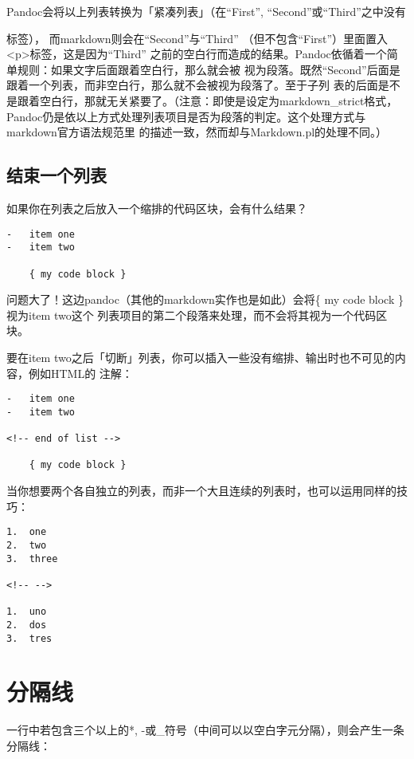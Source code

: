 \documentclass[fancyhdr,bookmark]{ctexbook}
\begin{document}
Pandoc会将以上列表转换为「紧凑列表」（在``First'',
``Second''或``Third''之中没有

标签）， 而markdown则会在``Second''与``Third''
（但不包含``First''）里面置入\textless{}p\textgreater{}标签，这是因为``Third''
之前的空白行而造成的结果。Pandoc依循着一个简单规则：如果文字后面跟着空白行，那么就会被
视为段落。既然``Second''后面是跟着一个列表，而非空白行，那么就不会被视为段落了。至于子列
表的后面是不是跟着空白行，那就无关紧要了。（注意：即使是设定为markdown\_strict格式，
Pandoc仍是依以上方式处理列表项目是否为段落的判定。这个处理方式与markdown官方语法规范里
的描述一致，然而却与Markdown.pl的处理不同。）

\subsection{结束一个列表}\label{ux7ed3ux675fux4e00ux4e2aux5217ux8868}

如果你在列表之后放入一个缩排的代码区块，会有什么结果？

\begin{lstlisting}
-   item one
-   item two

    { my code block }
\end{lstlisting}

问题大了！这边pandoc（其他的markdown实作也是如此）会将\{ my code block
\}视为item two这个
列表项目的第二个段落来处理，而不会将其视为一个代码区块。

要在item
two之后「切断」列表，你可以插入一些没有缩排、输出时也不可见的内容，例如HTML的
注解：

\begin{lstlisting}
-   item one
-   item two

<!-- end of list -->

    { my code block }
\end{lstlisting}

当你想要两个各自独立的列表，而非一个大且连续的列表时，也可以运用同样的技巧：

\begin{lstlisting}
1.  one
2.  two
3.  three

<!-- -->

1.  uno
2.  dos
3.  tres
\end{lstlisting}

\section{分隔线}\label{ux5206ux9694ux7ebf}

一行中若包含三个以上的*,
-或\_符号（中间可以以空白字元分隔），则会产生一条分隔线：
\end{document}

